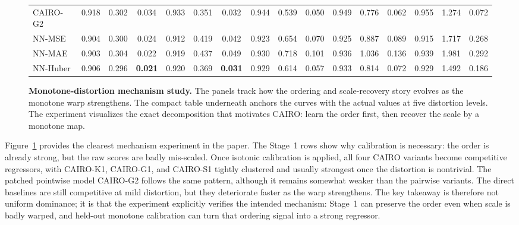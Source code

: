 \begin{figure}[t]
{{\begin{tabular}{l*{15}{c}}
CAIRO-G2         & 0.918 &  0.302 &  0.034 & 0.933 &  0.351 &  0.032 & 0.944 &  0.539 &  0.050 & 0.949 &  0.776 &  0.062 & 0.955 &  1.274 &  0.072 \\
NN-MSE           & 0.904 &  0.300 &  0.024 & 0.912 &  0.419 &  0.042 & 0.923 &  0.654 &  0.070 & 0.925 &  0.887 &  0.089 & 0.915 &  1.717 &  0.268 \\
NN-MAE           & 0.903 &  0.304 &  0.022 & 0.919 &  0.437 &  0.049 & 0.930 &  0.718 &  0.101 & 0.936 &  1.036 &  0.136 & 0.939 &  1.981 &  0.292 \\
NN-Huber         & 0.906 &  0.296 &  \textbf{0.021} & 0.920 &  0.369 &  \textbf{0.031} & 0.929 &  0.614 &  0.057 & 0.933 &  0.814 &  0.072 & 0.929 &  1.492 &  0.186 \\
\bottomrule
\end{tabular}}
}
\caption{\textbf{Monotone-distortion mechanism study.} The panels track how the ordering and scale-recovery story evolves as the monotone warp strengthens. The compact table underneath anchors the curves with the actual values at five distortion levels. The experiment visualizes the exact decomposition that motivates \textsc{CAIRO}: learn the order first, then recover the scale by a monotone map.}
\label{fig:monotone-story}
\end{figure}

Figure~\ref{fig:monotone-story} provides the clearest mechanism experiment in the paper. The Stage~1 rows show why calibration is necessary: the order is already strong, but the raw scores are badly mis-scaled. Once isotonic calibration is applied, all four \textsc{CAIRO} variants become competitive regressors, with \textsc{CAIRO-K1}, \textsc{CAIRO-G1}, and \textsc{CAIRO-S1} tightly clustered and usually strongest once the distortion is nontrivial. The patched pointwise model \textsc{CAIRO-G2} follows the same pattern, although it remains somewhat weaker than the pairwise variants. The direct baselines are still competitive at mild distortion, but they deteriorate faster as the warp strengthens. The key takeaway is therefore not uniform dominance; it is that the experiment explicitly verifies the intended mechanism: Stage~1 can preserve the order even when scale is badly warped, and held-out monotone calibration can turn that ordering signal into a strong regressor.

